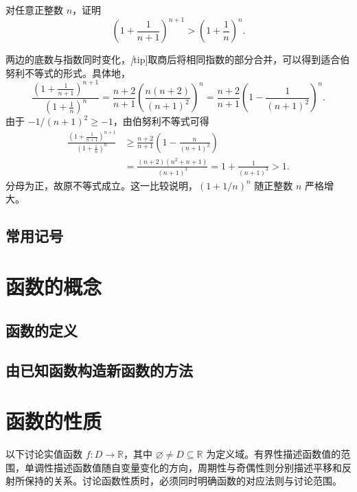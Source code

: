 \documentclass[UTF8,12pt,a4paper,fontset=fandol]{ctexbook}
\begin{document}
\begin{example}
\label{ex:bernoulli-adjacent-powers}
对任意正整数 $n$，证明
\[
    \left(1+\frac1{n+1}\right)^{n+1}
    >\left(1+\frac1n\right)^n.
\]
\end{example}

\begin{solve}
两边的底数与指数同时变化，\emph[tip]{取商后将相同指数的部分合并，可以得到适合伯努利不等式的形式。}具体地，
\[
    \frac{\left(1+\frac1{n+1}\right)^{n+1}}
         {\left(1+\frac1n\right)^n}
    =\frac{n+2}{n+1}
      \left(\frac{n(n+2)}{(n+1)^2}\right)^n
    =\frac{n+2}{n+1}
      \left(1-\frac1{(n+1)^2}\right)^n.
\]
由于 $-1/(n+1)^2\geq-1$，由伯努利不等式可得
\[
    \begin{aligned}
        \frac{\left(1+\frac1{n+1}\right)^{n+1}}
             {\left(1+\frac1n\right)^n}
        &\geq\frac{n+2}{n+1}
          \left(1-\frac{n}{(n+1)^2}\right)\\
        &=\frac{(n+2)(n^2+n+1)}{(n+1)^3}
          =1+\frac1{(n+1)^3}>1.
    \end{aligned}
\]
分母为正，故原不等式成立。这一比较说明，$(1+1/n)^n$ 随正整数 $n$ 严格增大。
\end{solve}

\subsection{常用记号}
\label{subsec:common-notation}

\section{函数的概念}
\label{sec:concept-of-functions}

\subsection{函数的定义}
\label{subsec:definition-of-functions}

\subsection{由已知函数构造新函数的方法}
\label{subsec:constructing-functions}

\section{函数的性质}
\label{sec:properties-of-functions}

以下讨论实值函数 $f:D\to\mathbb{R}$，其中 $\varnothing\neq D\subseteq\mathbb{R}$ 为定义域。有界性描述函数值的范围，单调性描述函数值随自变量变化的方向，周期性与奇偶性则分别描述平移和反射所保持的关系。讨论函数性质时，必须同时明确函数的对应法则与讨论范围。
\end{document}
